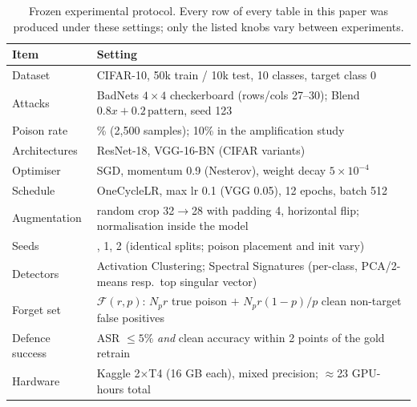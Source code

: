 \begin{table}[t]
\centering
\caption{Frozen experimental protocol. Every row of every table in this paper was produced under these settings; only the listed knobs vary between experiments.}
\label{tab:protocol}
\footnotesize
\begin{tabular}{@{}l >{\raggedright\arraybackslash}p{}@{}}
\toprule
\textbf{Item} & \textbf{Setting} \\
\midrule
Dataset & CIFAR-10, 50k train / 10k test, 10 classes, target class 0 \\
Attacks & BadNets $4\times4$ checkerboard (rows/cols 27--30); Blend $0.8x+0.2\,\mathrm{pattern}$, seed 123 \\
Poison rate & 5\% (2{,}500 samples); 10\% in the amplification study \\
Architectures & ResNet-18, VGG-16-BN (CIFAR variants) \\
Optimiser & SGD, momentum 0.9 (Nesterov), weight decay $5\times10^{-4}$ \\
Schedule & OneCycleLR, max lr 0.1 (VGG 0.05), 12 epochs, batch 512 \\
Augmentation & random crop 32$\to$28 with padding 4, horizontal flip; normalisation inside the model \\
Seeds & 0, 1, 2 (identical splits; poison placement and init vary) \\
Detectors & Activation Clustering; Spectral Signatures (per-class, PCA/2-means resp.\ top singular vector) \\
Forget set & $\mathcal{F}(r,p)$: $N_p r$ true poison $+$ $N_p r(1-p)/p$ clean non-target false positives \\
Defence success & ASR $\leq5\%$ \emph{and} clean accuracy within 2 points of the gold retrain \\
Hardware & Kaggle 2$\times$T4 (16 GB each), mixed precision; $\approx$23 GPU-hours total \\
\bottomrule
\end{tabular}
\end{table}
